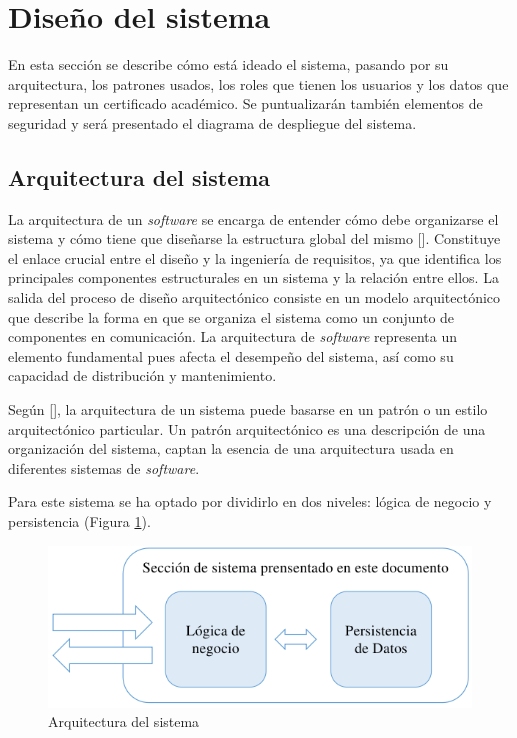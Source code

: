 \section{Diseño del sistema}
En esta sección se describe cómo está ideado el sistema, pasando por su arquitectura, los patrones usados, los roles que tienen los usuarios y los datos que representan un certificado académico. Se puntualizarán también elementos de seguridad y será presentado el diagrama de despliegue del sistema.

\subsection{Arquitectura del sistema}
La arquitectura de un \textit{software} se encarga de entender cómo debe organizarse el sistema y cómo tiene que diseñarse la estructura global del mismo [\cite{91}]. Constituye el enlace crucial entre el diseño y la ingeniería de requisitos, ya que identifica los principales componentes estructurales en un sistema y la relación entre ellos. La salida del proceso de diseño arquitectónico consiste en un modelo arquitectónico que describe la  forma en que se organiza el sistema como un conjunto de componentes en comunicación. La arquitectura de \textit{software} representa un elemento fundamental pues afecta el desempeño del sistema, así como su capacidad de distribución y mantenimiento.

Según [\cite{99}], la arquitectura de un sistema puede basarse en un patrón o un estilo arquitectónico particular. Un patrón arquitectónico es una descripción de una organización del sistema, captan la esencia de una arquitectura usada en diferentes sistemas de \textit{software}.

Para este sistema se ha optado por dividirlo en dos niveles: lógica de negocio y persistencia (Figura \ref{fig:8}). 

\begin{figure}[h]
	\centering
	\includegraphics[width=\linewidth]{Graphics/arquitectura-bs.png}
	\caption{Arquitectura del sistema}
	\label{fig:8}
\end{figure}

